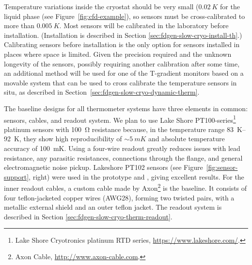 Temperature variations inside the cryostat should be very small ($\SI{0.02}{K}$ for the liquid phase (see Figure~\ref{fig:cfd-example}),
so sensors must be cross-calibrated to more than $\SI{0.005}{K}$. Most sensors will be calibrated in the laboratory before installation.
(Installation is described in Section \ref{sec:fdgen-slow-cryo-install-th}.)
Calibrating sensors before installation is the only option for sensors installed in places where space is limited. 
Given the precision required and the unknown longevity of the sensors, possibly requiring another  calibration after some time, an additional method
will be used for one of the T-gradient monitors based on a movable system that can be used to cross calibrate
the temperature sensors in situ, as described in Section~\ref{sec:fdgen-slow-cryo-dynamic-therm}.

The baseline designs for all thermometer systems have three elements in
common: sensors, cables, and readout system. We plan to use Lake Shore
PT100-series\footnote{Lake Shore Cryotronics\texttrademark{} platinum RTD series,
  \url{https://www.lakeshore.com/}.} %
platinum sensors with \SI{100}{\ohm} resistance %
because, in
the temperature range \SIrange{83}{92}{K}, %
they 
show high reproducibility of $\sim\SI{5}{mK}$ and absolute temperature
accuracy of \SI{100}{mK}.  Using a four-wire readout greatly reduces
issues with lead resistance, any parasitic resistances,
connections through the flange, and general electromagnetic noise
pickup. Lakeshore PT102 sensors (see
Figure~\ref{fig:sensor-support}, right) were used in the  prototype
and , %
giving excellent results. For the inner
readout cables, a custom cable made by Axon\footnote{Axon\texttrademark{} Cable, \url{http://www.axon-cable.com}.}
is the baseline. It
consists of four teflon-jacketed copper wires (AWG28), forming two
twisted pairs, with a metallic external shield and an outer teflon
jacket.
The readout system is described in Section \ref{sec:fdgen-slow-cryo-therm-readout}.

